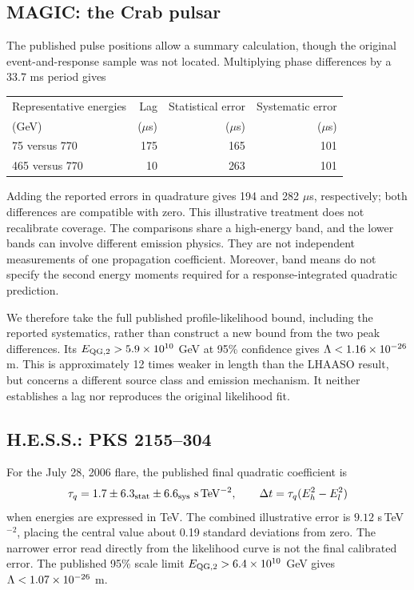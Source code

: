 \documentclass[11pt]{article}
\begin{document}
\subsection{MAGIC: the Crab pulsar}
The published pulse positions \cite{crab} allow a summary calculation, though the original event-and-response sample was not located. Multiplying phase differences by a 33.7 ms period gives
\begin{center}
\begin{tabular}{lrrr}
\hline
Representative energies & Lag & Statistical error & Systematic error\\
(GeV) & ($\mu$s) & ($\mu$s) & ($\mu$s)\\ \hline
75 versus 770 & 175 & 165 & 101\\
465 versus 770 & 10 & 263 & 101\\ \hline
\end{tabular}
\end{center}
Adding the reported errors in quadrature gives 194 and 282 $\mu$s, respectively; both differences are compatible with zero. This illustrative treatment does not recalibrate coverage. The comparisons share a high-energy band, and the lower bands can involve different emission physics. They are not independent measurements of one propagation coefficient. Moreover, band means do not specify the second energy moments required for a response-integrated quadratic prediction.

We therefore take the full published profile-likelihood bound, including the reported systematics, rather than construct a new bound from the two peak differences. Its $E_{\rm QG,2}>5.9\times10^{10}$ GeV at 95\% confidence gives $\Lambda<1.16\times10^{-26}$ m. This is approximately 12 times weaker in length than the LHAASO result, but concerns a different source class and emission mechanism. It neither establishes a lag nor reproduces the original likelihood fit.

\subsection{H.E.S.S.: PKS 2155--304}
For the July 28, 2006 flare, the published final quadratic coefficient is \cite{pks}
\begin{equation}
 \tau_q=1.7\pm6.3_{\rm stat}\pm6.6_{\rm sys}\
 \mathrm{s\,TeV^{-2}},\qquad
 \Delta t=\tau_q(E_h^2-E_l^2)
\end{equation}
when energies are expressed in TeV. The combined illustrative error is $9.12$ s\,TeV$^{-2}$, placing the central value about 0.19 standard deviations from zero. The narrower error read directly from the likelihood curve is not the final calibrated error. The published 95\% scale limit $E_{\rm QG,2}>6.4\times10^{10}$ GeV gives $\Lambda<1.07\times10^{-26}$ m.
\end{document}
